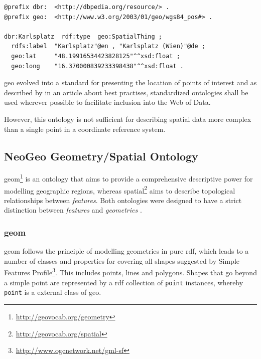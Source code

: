 \documentclass[draft,final]{vutinfth} %
\begin{document}
\begin{lstlisting}[frame=single, caption=Snippet of DBpedia, label={lst:related-work-geospatial-ontologies:wgs84-dbpedia}]
@prefix dbr:  <http://dbpedia.org/resource/> .
@prefix geo:  <http://www.w3.org/2003/01/geo/wgs84_pos#> .

dbr:Karlsplatz  rdf:type  geo:SpatialThing ;
  rdfs:label  "Karlsplatz"@en , "Karlsplatz (Wien)"@de ;
  geo:lat     "48.19916534423828125"^^xsd:float ;
  geo:long    "16.370000839233398438"^^xsd:float .
\end{lstlisting}

\gls{geo} evolved into a standard for presenting the location of points of interest and as described by \cite{hyland_best_2014} in an article about best practises, standardized ontologies shall be used wherever possible to facilitate
inclusion into the Web of Data.

However, this ontology is not sufficient for describing spatial data more complex than a single point in a coordinate reference system.

\subsection{NeoGeo Geometry/Spatial Ontology}
\gls{geom}\footnote{\url{http://geovocab.org/geometry}} is an ontology that aims to provide a comprehensive descriptive power for modelling geographic regions, whereas \gls{spatial}\footnote{\url{http://geovocab.org/spatial}} aims to describe topological relationships between \textit{features}. Both ontologies were designed to have a strict distinction between \textit{features} and \textit{geometries} \cite{norton_neogeo_2012}.

\subsubsection{\gls{geom}} 
\gls{geom} follows the principle of modelling geometries in pure \gls{rdf}, which leads to a number of classes and properties for covering all shapes suggested by Simple Features Profile\footnote{\url{http://www.ogcnetwork.net/gml-sf}}. This includes points, lines and polygons. Shapes that go beyond a simple point are represented by a \gls{rdf} collection of \texttt{point} instances, whereby \texttt{point} is a external class of \gls{geo}.  
\end{document}
